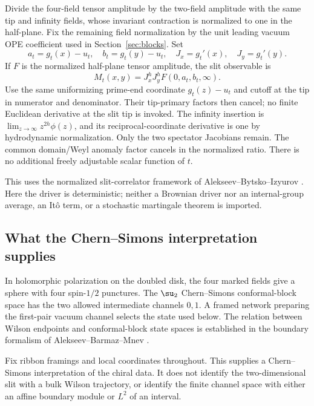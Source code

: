 Divide the four-field tensor amplitude by the two-field amplitude with the
same tip and infinity fields, whose invariant contraction is normalized to
one in the half-plane. Fix the remaining field normalization by the unit
leading vacuum OPE coefficient used in Section~\ref{sec:blocks}. Set
\begin{equation}
 a_t=g_t(x)-u_t,\quad b_t=g_t(y)-u_t,\quad
 J_x=g_t'(x),\quad J_y=g_t'(y).
\end{equation}
If $F$ is the normalized half-plane tensor amplitude, the slit observable is
\begin{equation}
 M_t(x,y)=J_x^hJ_y^h F(0,a_t,b_t,\infty).
 \label{eq:observable}
\end{equation}
Use the same uniformizing prime-end coordinate $g_t(z)-u_t$ and cutoff at
the tip in numerator and denominator. Their tip-primary factors then
cancel; no finite Euclidean derivative at the slit tip is invoked.
The infinity insertion is $\lim_{z\to\infty}z^{2h}\phi(z)$, and its
reciprocal-coordinate derivative is one by hydrodynamic normalization.
Only the two spectator Jacobians remain. The common domain/Weyl anomaly
factor cancels in the normalized ratio. There is no additional freely
adjustable scalar function of $t$.

This uses the normalized slit-correlator framework of
Alekseev--Bytsko--Izyurov \cite{ABI}. Here the driver is deterministic;
neither a Brownian driver nor an internal-group average, an It\^o term,
or a stochastic martingale theorem is imported.

\subsection{What the Chern--Simons interpretation supplies}

In holomorphic polarization on the doubled disk, the four marked fields
give a sphere with four spin-$1/2$ punctures. The $\su_2$ Chern--Simons
conformal-block space has the two allowed intermediate channels $0,1$.
A framed network preparing the first-pair vacuum channel selects the state
used below. The relation between Wilson endpoints and conformal-block state
spaces is established in the boundary formalism of
Alekseev--Barmaz--Mnev \cite{ABM}.

Fix ribbon framings and local coordinates throughout. This supplies a
Chern--Simons interpretation of the chiral data. It does not identify the
two-dimensional slit with a bulk Wilson trajectory, or identify the finite
channel space with either an affine boundary module or $L^2$ of an interval.
